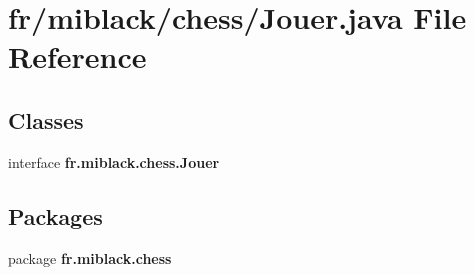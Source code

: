 \section{fr/miblack/chess/\-Jouer.java File Reference}
\label{Jouer_8java}
\subsection*{Classes}
\begin{DoxyCompactItemize}
\item 
interface {\bf fr.\-miblack.\-chess.\-Jouer}
\end{DoxyCompactItemize}
\subsection*{Packages}
\begin{DoxyCompactItemize}
\item 
package {\bf fr.\-miblack.\-chess}
\end{DoxyCompactItemize}
